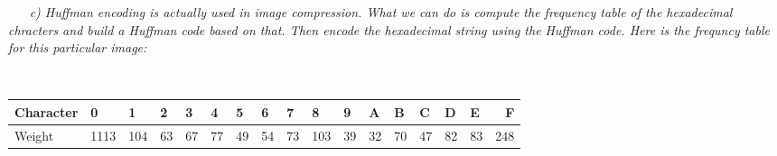 \documentclass[12pt, letterpaper]{article}
\begin{document}
\-\ \newline
\-\ \it{ c) Huffman encoding is actually used in image compression. What we can do is compute the frequency table of the hexadecimal chracters and build a Huffman code based on that. Then encode the hexadecimal string using the Huffman code. Here is the frequncy table for this particular image:}

\-\ \newline
{
\centering
\begin{tabular}{ | l | l | l | l | l | l | l | l | l | l | l | l | l | l | l | l | r | }
    \hline			
    \textnormal{Character} & 0 & 1 & 2 & 3 & 4 & 5 & 6 & 7 & 8 & 9 & A & B & C & D & E & F \\
    \hline
    \textnormal{Weight} & 1113 & 104 & 63 & 67 & 77 & 49 & 54 & 73 & 103 & 39 & 32 & 70 & 47 & 82 & 83 & 248 \\
    \hline  
  \end{tabular}\par
}
\end{document}
